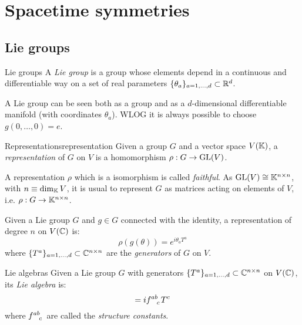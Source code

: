 \newpage

\section{Spacetime symmetries}

\subsection{Lie groups}

\begin{definition}{Lie groups}{}
  A \textit{Lie group} is a group whose elements depend in a continuous and differentiable way on a set of real parameters $ \{\theta_a\}_{a = 1, \dots, d} \subset \mathbb{R}^d $.
\end{definition}

A Lie group can be seen both as a group and as a $ d $-dimensional differentiable manifold (with coordinates $ \theta_a $). WLOG it is always possible to choose $ g(0,\dots,0) = e $.

\begin{definition}{Representations}{representation}
  Given a group $ G $ and a vector space $ V(\mathbb{K}) $, a \textit{representation} of $ G $ on $ V $ is a homomorphism $ \rho : G \rightarrow \mathrm{GL}(V) $.
\end{definition}

A representation $ \rho $ which is a isomorphism is called \textit{faithful}. As $ \mathrm{GL}(V) \cong \mathbb{K}^{n \times n} $, with $ n \equiv \dim_{\mathbb{K}} V $, it is usual to represent $ G $ as matrices acting on elements of $ V $, i.e. $ \rho : G \rightarrow \mathbb{K}^{n \times n} $.

\begin{theorem}{}{}
  Given a Lie group $ G $ and $ g \in G $ connected with the identity, a representation of degree $ n $ on $ V(\mathbb{C}) $ is:
  \begin{equation}
    \rho(g(\theta)) = e^{i \theta_a T^a}
  \end{equation}
  where $ \{T^a\}_{a = 1, \dots, d} \subset \mathbb{C}^{n \times n} $ are the \textit{generators} of $ G $ on $ V $.
\end{theorem}

\begin{definition}{Lie algebras}{}
  Given a Lie group $ G $ with generators $ \{T^a\}_{a = 1, \dots, d} \subset \mathbb{C}^{n \times n} $ on $ V(\mathbb{C}) $, its \textit{Lie algebra} is:
  \begin{equation}
    [T^a, T^b] = i \tensor{f}{^a^b_c} T^c
  \end{equation}
  where $ \tensor{f}{^a^b_c} $ are called the \textit{structure constants}.
\end{definition}

